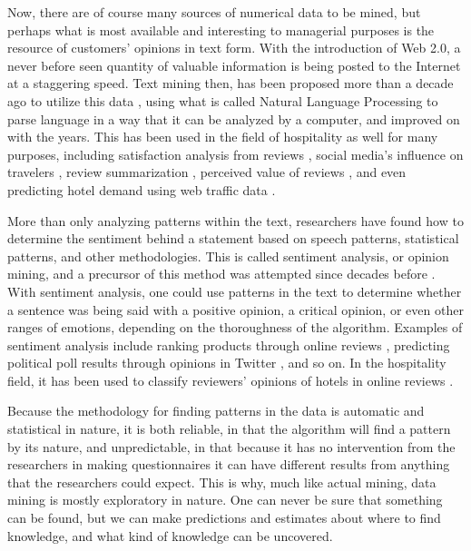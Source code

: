 \documentclass[review]{elsarticle}
\begin{document}
Now, there are of course many sources of numerical data to be mined, but perhaps what is most available and interesting to managerial purposes is the resource of customers' opinions in text form. With the introduction of Web 2.0, a never before seen quantity of valuable information is being posted to the Internet at a staggering speed. Text mining then, has been proposed more than a decade ago to utilize this data \cite[e.g.][]{rajman1998text,nahm2002text}, using what is called Natural Language Processing to parse language in a way that it can be analyzed by a computer, and improved on with the years. This has been used in the field of hospitality as well for many purposes, including satisfaction analysis from reviews \cite[e.g][]{berezina2016, xu2016, xiang2015, hargreaves2015, balbi2018}, social media's influence on travelers \cite[e.g.][]{xiang2010}, review summarization \cite[e.g.][]{hu2017436}, perceived value of reviews \cite[e.g][]{FANG2016498}, and even predicting hotel demand using web traffic data \cite[e.g][]{yang2014}.

More than only analyzing patterns within the text, researchers have found how to determine the sentiment behind a statement based on speech patterns, statistical patterns, and other methodologies. This is called sentiment analysis, or opinion mining, and a precursor of this method was attempted since decades before \cite[][]{stone1966general}. With sentiment analysis, one could use patterns in the text to determine whether a sentence was being said with a positive opinion, a critical opinion, or even other ranges of emotions, depending on the thoroughness of the algorithm. Examples of sentiment analysis include ranking products through online reviews \cite[e.g][]{liu2017149, zhang2011}, predicting political poll results through opinions in Twitter \cite[][]{oconnor2010}, and so on. In the hospitality field, it has been used to classify reviewers' opinions of hotels in online reviews \cite[e.g.]{kim2017362, alsmadi2018}. 

Because the methodology for finding patterns in the data is automatic and statistical in nature, it is both reliable, in that the algorithm will find a pattern by its nature, and unpredictable, in that because it has no intervention from the researchers in making questionnaires it can have different results from anything that the researchers could expect. This is why, much like actual mining, data mining is mostly exploratory in nature. One can never be sure that something can be found, but we can make predictions and estimates about where to find knowledge, and what kind of knowledge can be uncovered. 
\end{document}
